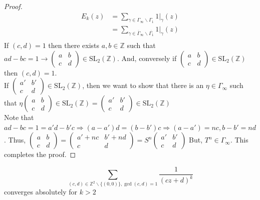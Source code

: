 \documentclass[oneside, 12pt]{scrbook}
\newcommand{\ZZ}{\mathbb Z}
\newcommand{\SL}{\mathrm{SL}}
\theoremstyle{theorem}
\begin{document}
\begin{proof}
\begin{align*}
E_{k}(z) &= \sum_{\gamma \in \Gamma_{\infty} \backslash \Gamma_{1}} 1|_{\gamma}(z) \\
&= \sum_{\gamma \in \overline{\Gamma}_{\infty} \backslash \overline{\Gamma_{1}}} 1|_{\gamma}(z) \\
\end{align*}
If $(c,d)=1$ then there exists $a,b \in \ZZ$ such that $ad-bc=1 \rightarrow \begin{pmatrix}
a & b \\ c & d
\end{pmatrix} \in \SL_{2}(\ZZ)$. And, conversely if $\begin{pmatrix}
a & b \\ c & d
\end{pmatrix} \in \SL_{2}(\ZZ)$ then $(c,d)=1$. \\

If $\begin{pmatrix}
a' & b' \\ c & d
\end{pmatrix} \in \SL_{2}(\ZZ)$, then we want to show that there is an $\eta \in \Gamma_{\infty}$ such that $\eta\begin{pmatrix}
a & b \\ c & d
\end{pmatrix} \in \SL_{2}(\ZZ) = \begin{pmatrix}
a' & b' \\ c & d
\end{pmatrix} \in \SL_{2}(\ZZ)$\\

Note that $ad-bc=1=a'd-b'c \Rightarrow (a-a')d=(b-b')c \Rightarrow (a-a')=nc, b-b'=nd$. Thus, $\begin{pmatrix}
a & b \\ c & d
\end{pmatrix} = \begin{pmatrix}
a' + nc & b' + nd \\ c & d
\end{pmatrix} = S^n \begin{pmatrix}
a' & b' \\ c & d
\end{pmatrix}$
But, $T^n \in \Gamma_{\infty}$. This completes the proof.
\end{proof}

\begin{proposition}[DS, Exercise 1.1.4]
$$\sum_{(c,d) \in \ZZ^{2} \backslash \{(0,0)\}, \gcd(c,d)=1} \frac{1}{(cz+d)^k}$$ converges absolutely for $k>2$
\end{proposition}
\end{document}
